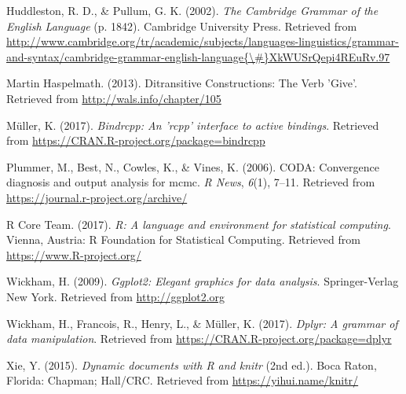 \documentclass[english,floatsintext,man]{apa6}
\theoremstyle{definition}
\theoremstyle{definition}
\theoremstyle{definition}
\theoremstyle{remark}
\begin{document}
\hypertarget{ref-Huddleston2002}{}
Huddleston, R. D., \& Pullum, G. K. (2002). \emph{The Cambridge Grammar
of the English Language} (p. 1842). Cambridge University Press.
Retrieved from
\href{http://www.cambridge.org/tr/academic/subjects/languages-linguistics/grammar-and-syntax/cambridge-grammar-english-language\%7B/\#\%7DXkWUSrQepi4REuRv.97}{http://www.cambridge.org/tr/academic/subjects/languages-linguistics/grammar-and-syntax/cambridge-grammar-english-language\{\textbackslash{}\#\}XkWUSrQepi4REuRv.97}

\hypertarget{ref-MartinHaspelmath2013}{}
Martin Haspelmath. (2013). Ditransitive Constructions: The Verb 'Give'.
Retrieved from \url{http://wals.info/chapter/105}

\hypertarget{ref-R-bindrcpp}{}
Müller, K. (2017). \emph{Bindrcpp: An 'rcpp' interface to active
bindings}. Retrieved from
\url{https://CRAN.R-project.org/package=bindrcpp}

\hypertarget{ref-R-coda}{}
Plummer, M., Best, N., Cowles, K., \& Vines, K. (2006). CODA:
Convergence diagnosis and output analysis for mcmc. \emph{R News},
\emph{6}(1), 7--11. Retrieved from
\url{https://journal.r-project.org/archive/}

\hypertarget{ref-R-base}{}
R Core Team. (2017). \emph{R: A language and environment for statistical
computing}. Vienna, Austria: R Foundation for Statistical Computing.
Retrieved from \url{https://www.R-project.org/}

\hypertarget{ref-R-ggplot2}{}
Wickham, H. (2009). \emph{Ggplot2: Elegant graphics for data analysis}.
Springer-Verlag New York. Retrieved from \url{http://ggplot2.org}

\hypertarget{ref-R-dplyr}{}
Wickham, H., Francois, R., Henry, L., \& Müller, K. (2017). \emph{Dplyr:
A grammar of data manipulation}. Retrieved from
\url{https://CRAN.R-project.org/package=dplyr}

\hypertarget{ref-R-knitr}{}
Xie, Y. (2015). \emph{Dynamic documents with R and knitr} (2nd ed.).
Boca Raton, Florida: Chapman; Hall/CRC. Retrieved from
\url{https://yihui.name/knitr/}
\end{document}
